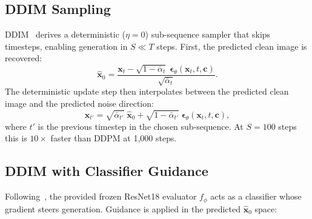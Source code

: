 \documentclass[12pt, a4paper]{report}
\begin{document}
\subsection{DDIM Sampling}

DDIM~\cite{song2020ddim} derives a deterministic ($\eta=0$) sub-sequence sampler
that skips timesteps, enabling generation in $S \ll T$ steps.
First, the predicted clean image is recovered:
\[
  \hat{\mathbf{x}}_0
    = \frac{
        \mathbf{x}_t
        - \sqrt{1-\bar\alpha_t}\;
          \boldsymbol\epsilon_\theta(\mathbf{x}_t, t, \mathbf{c})
      }{\sqrt{\bar\alpha_t}}.
\]
The deterministic update step then interpolates between the predicted clean image and
the predicted noise direction:
\[
  \mathbf{x}_{t'}
    = \sqrt{\bar\alpha_{t'}}\;\hat{\mathbf{x}}_0
    + \sqrt{1-\bar\alpha_{t'}}\;
      \boldsymbol\epsilon_\theta(\mathbf{x}_t, t, \mathbf{c}),
\]
where $t'$ is the previous timestep in the chosen sub-sequence.
At $S=100$ steps this is $10\times$ faster than DDPM at 1{,}000 steps.

\subsection{DDIM with Classifier Guidance}

Following~\cite{dhariwal2021beatgans}, the provided frozen ResNet18 evaluator
$f_\phi$ acts as a classifier whose gradient steers generation.
Guidance is applied in the predicted $\hat{\mathbf{x}}_0$ space:
\end{document}
